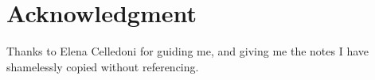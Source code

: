 \section*{Acknowledgment}
Thanks to Elena Celledoni for guiding me, and giving me the notes\cite{elena} I have shamelessly copied without referencing.
